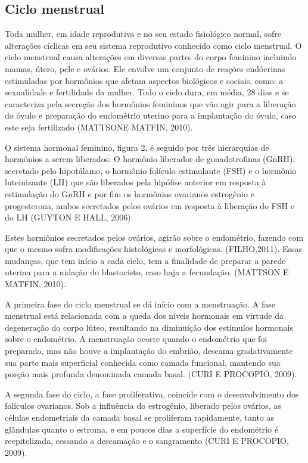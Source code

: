 \documentclass[12pt]{article} %
\begin{document}
\subsection{Ciclo menstrual}


Toda mulher, em idade reprodutiva e no seu estado fisiológico normal, sofre alterações cíclicas em
seu sistema reprodutivo conhecido como ciclo menstrual. O ciclo
menstrual causa alterações em diversas partes do corpo feminino
incluindo mamas, útero, pele e ovários. Ele envolve um conjunto de
reações endócrinas estimuladas por hormônios que afetam aspectos biológicos e
sociais, como: a sexualidade e fertilidade da
mulher. Todo o ciclo dura, em média, 28 dias e se caracteriza pela
secreção dos hormônios femininos que vão agir para a liberação do
óvulo e preparação do endométrio uterino para a implantação do óvulo,
caso este seja fertilizado (MATTSONE MATFIN, 2010).

O sistema hormonal feminino, figura 2, é seguido por três hierarquias de hormônios
a serem liberados: O hormônio liberador de gonadotrofinas (GnRH),
secretado pelo hipotálamo, o hormônio folículo estimulante (FSH) e o
hormônio luteinizante (LH) que são liberados pela hipófise anterior
em resposta à estimulação do GnRH e por fim os hormônios ovarianos
estrogênio e progesterona, ambos secretados pelos ovários em resposta
à liberação do FSH e do LH (GUYTON E HALL, 2006).


Estes hormônios secretados pelos ovários, agirão sobre o endométrio,
fazendo com que o mesmo sofra modificações histológicas e
morfológicas.  (FILHO,2011).  Essas mudanças, que
tem início a cada ciclo, tem a finalidade de preparar a parede uterina
para a nidação do blastocisto, caso haja a fecundação. (MATTSON E MATFIN, 2010).


A primeira fase do ciclo menstrual se dá início com a menstruação. A
fase menstrual está relacionada com a queda dos níveis hormonais em
virtude da degeneração do corpo lúteo, resultando na diminuição dos
estímulos hormonais sobre o endométrio. A menstruação ocorre quando o
endométrio que foi preparado, mas não houve a implantação do embrião,
descama gradativamente sua parte mais superficial conhecida como
camada funcional, mantendo sua porção mais profunda denominada camada
basal. (CURI E PROCOPIO, 2009).

A segunda fase do ciclo, a fase proliferativa, coincide com o
desenvolvimento dos folículos ovarianos. Sob a influência do
estrogênio, liberado pelos ovários, as células endometriais da camada
basal se proliferam rapidamente, tanto as glândulas quanto o estroma,
e em poucos dias a superfície do endométrio é reepitelizada, cessando
a descamação e o sangramento (CURI E PROCOPIO, 2009).
\end{document}
